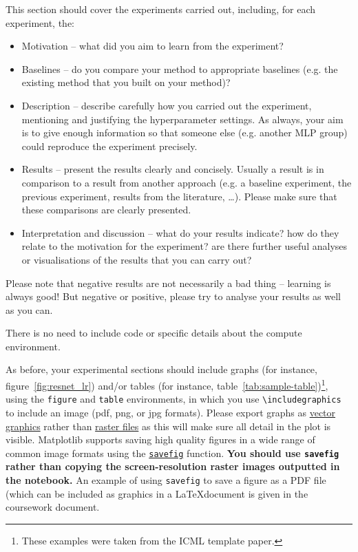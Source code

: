 \documentclass{article}
\begin{document}
\iffalse
This section should cover the experiments carried out, including, for each experiment, the:
\begin{itemize}
    \item  Motivation -- what did you aim to learn from the experiment?
    \item  Baselines -- do you compare your method to appropriate baselines (e.g. the existing method that you built on your method)?
    \item  Description -- describe carefully how you carried out the experiment, mentioning and justifying the hyperparameter settings. As always, your aim is to give enough information so that someone else (e.g. another MLP group) could reproduce the experiment precisely.
    \item  Results -- present the results clearly and concisely. Usually a result is in comparison to a result from another approach (e.g. a baseline experiment, the previous experiment, results from the literature, \dots).  Please make sure that these comparisons are clearly presented.
    \item Interpretation and discussion -- what do your results indicate? how do they relate to the motivation for the experiment? are there further useful analyses or visualisations of the results that you can carry out?
\end{itemize}

Please note that negative results are not necessarily a bad thing -- learning is always good! But negative or positive, please try to analyse your results as well as you can.

There is no need to include code or specific details about the compute environment.

As before, your experimental sections should include graphs (for instance, figure~\ref{fig:resnet_lr}) and/or tables (for instance, table~\ref{tab:sample-table})\footnote{These examples were taken from the ICML template paper.}, using the \verb+figure+ and \verb+table+ environments, in which you use \verb+\includegraphics+ to include an image (pdf, png, or jpg formats).  Please export graphs as 
\href{https://en.wikipedia.org/wiki/Vector_graphics}{vector graphics}
rather than \href{https://en.wikipedia.org/wiki/Raster_graphics}{raster
files} as this will make sure all detail in the plot is visible.
Matplotlib supports saving high quality figures in a wide range of
common image formats using the
\href{http://matplotlib.org/api/pyplot_api.html\#matplotlib.pyplot.savefig}{\texttt{savefig}}
function. \textbf{You should use \texttt{savefig} rather than copying
the screen-resolution raster images outputted in the notebook.} An
example of using \texttt{savefig} to save a figure as a PDF file (which
can be included as graphics in a \LaTeX document is given in the coursework document.
\end{document}
